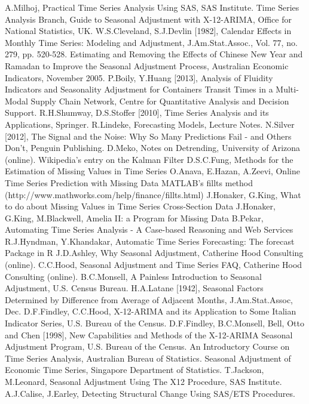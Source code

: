 \begin{thebibliography}{99}
 A.Milhoj, Practical Time Series Analysis Using SAS, SAS Institute. 
 Time Series Analysis Branch, Guide to Seasonal Adjustment with X-12-ARIMA,  Office for National Statistics, UK. 
 W.S.Cleveland, S.J.Devlin [1982], Calendar Effects in Monthly Time Series: Modeling and Adjustment, J.Am.Stat.Assoc., Vol. 77, no. 279, pp. 520-528.
 Estimating and Removing the Effects of Chinese New Year and Ramadan to Improve the Seasonal Adjustment Process, Australian Economic Indicators, November 2005.
 P.Boily, Y.Huang [2013], Analysis of Fluidity Indicators and Seasonality Adjustment for Containers Transit Times in a Multi-Modal Supply Chain Network, Centre for Quantitative Analysis and Decision Support. 
 R.H.Shumway, D.S.Stoffer [2010], Time Series Analysis and its Applications, Springer.
 R.Lindeke, Forecasting Models, Lecture Notes.
 N.Silver [2012], The Signal and the Noise: Why So Many Predictions Fail - and Others Don't, Penguin Publishing.
 D.Meko, Notes on Detrending, University of Arizona (online).
 Wikipedia's entry on the Kalman Filter 
 D.S.C.Fung, Methods for the Estimation of Missing Values in Time Series    
 O.Anava, E.Hazan, A.Zeevi, Online Time Series Prediction with Missing Data 
 MATLAB's fillts method (http://www.mathworks.com/help/finance/fillts.html)
 J.Honaker, G.King, What to do about Missing Values in Time Series Cross-Section Data
 J.Honaker, G.King, M.Blackwell, Amelia II: a Program for Missing Data 
 B.Pekar, Automating Time Series Analysis - A Case-based Reasoning and Web Services  R.J.Hyndman, Y.Khandakar, Automatic Time Series Forecasting: The forecast Package in R 
 J.D.Ashley, Why Seasonal Adjustment, Catherine Hood Consulting (online).
 C.C.Hood, Seasonal Adjustment and Time Series FAQ, Catherine Hood Consulting (online).
 B.C.Monsell, A Painless Introduction to Seasonal Adjustment, U.S. Census Bureau.
 H.A.Latane [1942], Seasonal Factors Determined by Difference from Average of Adjacent Months, J.Am.Stat.Assoc, Dec.
 D.F.Findley, C.C.Hood, X-12-ARIMA and its Application to Some Italian Indicator Series,  U.S. Bureau of the Census.
 D.F.Findley, B.C.Monsell, Bell, Otto and Chen [1998], New Capabilities and Methods of the X-12-ARIMA Seasonal Adjustment Program, U.S. Bureau of the Census. 
 An Introductory Course on Time Series Analysis, Australian Bureau of Statistics. 
 Seasonal Adjustment of Economic Time Series, Singapore Department of Statistics.
 T.Jackson, M.Leonard, Seasonal Adjustment Using The X12 Procedure, SAS Institute.
 A.J.Calise, J.Earley, Detecting Structural Change Using SAS/ETS Procedures.


\end{thebibliography}
